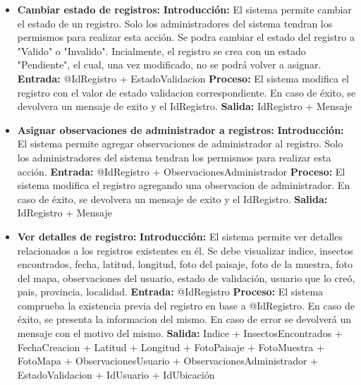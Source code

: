 \begin{enumerate}[A.]
\begin{itemize}
          \item \textbf{Cambiar estado de registros:}
            \tab \textbf{Introducción:} El sistema permite cambiar el estado de un registro. Solo los administradores del sistema tendran los permismos para realizar esta acción. Se podra cambiar el estado del registro a "Valido" o "Invalido". Incialmente, el registro se crea con un estado "Pendiente", el cual, una vez modificado, no se podrá volver a asignar.
            \tab \textbf{Entrada:} @IdRegistro + EstadoValidacion
            \tab \textbf{Proceso:} El sistema modifica el registro con el valor de estado validacion correspondiente. En caso de éxito, se devolvera un mensaje de exito y el IdRegistro.
            \tab \textbf{Salida:} IdRegistro + Mensaje

          \item \textbf{Asignar observaciones de administrador a registros:}
            \tab \textbf{Introducción:} El sistema permite agregar observaciones de administrador al registro. Solo los administradores del sistema tendran los permismos para realizar esta acción.
            \tab \textbf{Entrada:} @IdRegistro + ObservacionesAdministrador
            \tab \textbf{Proceso:} El sistema modifica el registro agregando una observacion de administrador. En caso de éxito, se devolvera un mensaje de exito y el IdRegistro.
            \tab \textbf{Salida:} IdRegistro + Mensaje

          \item \textbf{Ver detalles de registro:}
            \tab \textbf{Introducción:} El sistema permite ver detalles relacionados a los registros existentes en él. Se debe visualizar indice, insectos encontrados, fecha, latitud, longitud, foto del paisaje, foto de la muestra, foto del mapa, observaciones del usuario, estado de validación, usuario que lo creó, pais, provincia, localidad.
            \tab \textbf{Entrada:} @IdRegistro
            \tab \textbf{Proceso:} El sistema comprueba la existencia previa del registro en base a @IdRegistro. En caso de éxito, se presenta la informacion del mismo. En caso de error se devolverá un mensaje con el motivo del mismo.
            \tab \textbf{Salida:} Indice + InsectosEncontrados + FechaCreacion + Latitud + Longitud + FotoPaisaje + FotoMuestra + FotoMapa + ObservacionesUsuario + ObservacionesAdministrador + EstadoValidacion + IdUsuario + IdUbicación


\end{itemize}
\end{enumerate}
